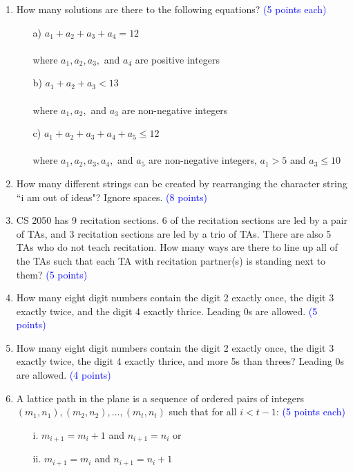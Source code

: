 \documentclass{article}
\newcommand{\pt}[1]{\textcolor{blue}{(#1 points)}}
\newcommand{\pte}[1]{\textcolor{blue}{(#1 points each)}}
\begin{document}
\begin{enumerate}
\item How many solutions are there to the following equations? \pte{5}
\begin{enumerate}
    \item[a)] $a_1 + a_2 + a_3 + a_4 = 12$\\\\
where $a_1, a_2, a_3,$ and $a_4$ are positive integers\\

    \item[b)] $a_1 + a_2 + a_3 < 13$\\\\
    where $a_1, a_2,$ and $a_3$ are non-negative integers\\

    \item[c)] $a_1 + a_2 + a_3 + a_4 + a_5 \leq 12$\\\\
    where $a_1, a_2, a_3, a_4,$ and $a_5$ are non-negative integers, $a_1 > 5$ and $a_3 \leq 10$\\
    
\end{enumerate}

\item How many different strings can be created by rearranging the character string ``i am out of ideas"? Ignore spaces. \pt{8}

\item CS 2050 has 9 recitation sections. 6 of the recitation sections are led by a pair of TAs, and 3 recitation sections are led by a trio of TAs. There are also 5 TAs who do not teach recitation. How many ways are there to line up all of the TAs such that each TA with recitation partner(s) is standing next to them? \pt{5}

\item How many eight digit numbers contain the digit 2 exactly once, the digit 3 exactly twice, and the digit 4 exactly thrice. Leading 0s are allowed. \pt{5}

\item How many eight digit numbers contain the digit 2 exactly once, the digit 3 exactly twice, the digit 4 exactly thrice, and more 5s than threes? Leading 0s are allowed. \pt{4}

\item A lattice path in the plane is a sequence of ordered pairs of integers $(m_1,n_1),(m_2,n_2),\dots,(m_t,n_t)$ such that for all $i < t-1$: \pte{5}
\begin{enumerate}
    \item[i.] $m_{i+1}=m_i+1$ and $n_{i+1} = n_i$ or
    \item[ii.] $m_{i+1}=m_i$ and $n_{i+1}=n_i+1$
\end{enumerate}


\end{enumerate}
\end{document}

